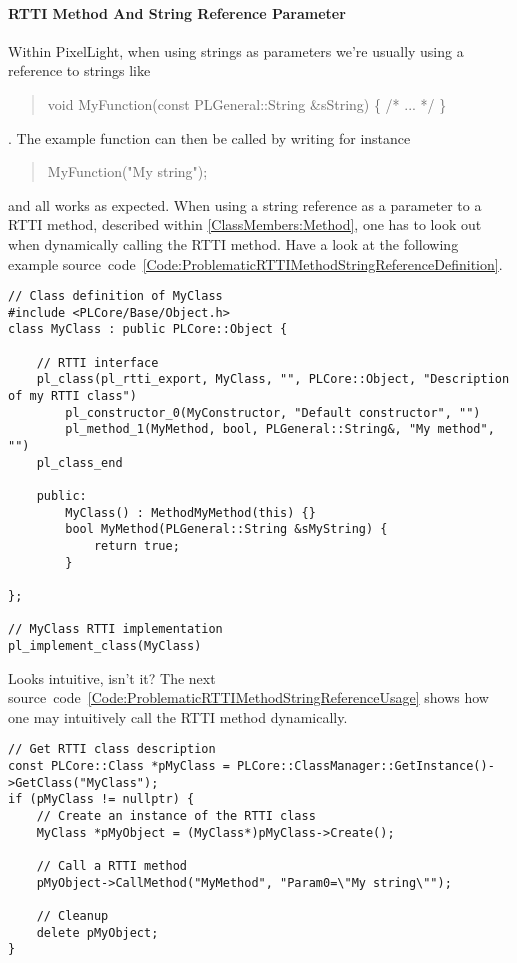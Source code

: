\paragraph{RTTI Method And String Reference Parameter}
\label{Appendix:CommonPitfalls:RTTIMethodStringReferenceParameter}
Within PixelLight, when using strings as parameters we're usually using a reference to strings like \begin{quote}void MyFunction(const PLGeneral::String \&sString) \{ /* ... */ \}\end{quote}. The example function can then be called by writing for instance \begin{quote}MyFunction("My string");\end{quote} and all works as expected. When using a string reference as a parameter to a RTTI method, described within \ref{ClassMembers:Method}, one has to look out when dynamically calling the RTTI method. Have a look at the following example source~code~\ref{Code:ProblematicRTTIMethodStringReferenceDefinition}.
\begin{lstlisting}[label=Code:ProblematicRTTIMethodStringReferenceDefinition,caption={Problematic RTTI method and string reference parameter definition}]
// Class definition of MyClass
#include <PLCore/Base/Object.h>
class MyClass : public PLCore::Object {

	// RTTI interface
	pl_class(pl_rtti_export, MyClass, "", PLCore::Object, "Description of my RTTI class")
		pl_constructor_0(MyConstructor, "Default constructor", "")
		pl_method_1(MyMethod, bool, PLGeneral::String&, "My method", "")
	pl_class_end

	public:
		MyClass() : MethodMyMethod(this) {}
		bool MyMethod(PLGeneral::String &sMyString) {
			return true;
		}

};

// MyClass RTTI implementation
pl_implement_class(MyClass)
\end{lstlisting}
Looks intuitive, isn't it? The next source~code~\ref{Code:ProblematicRTTIMethodStringReferenceUsage} shows how one may intuitively call the RTTI method dynamically.
\begin{lstlisting}[label=Code:ProblematicRTTIMethodStringReferenceUsage,caption={Problematic RTTI method and string reference parameter usage}]
// Get RTTI class description
const PLCore::Class *pMyClass = PLCore::ClassManager::GetInstance()->GetClass("MyClass");
if (pMyClass != nullptr) {
	// Create an instance of the RTTI class
	MyClass *pMyObject = (MyClass*)pMyClass->Create();

	// Call a RTTI method
	pMyObject->CallMethod("MyMethod", "Param0=\"My string\"");

	// Cleanup
	delete pMyObject;
}
\end{lstlisting}
